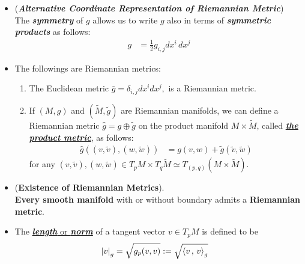 \documentclass[11pt]{article}
\begin{document}
\begin{itemize}
\item \begin{remark} (\emph{\textbf{Alternative Coordinate Representation of Riemannian Metric}})\\
The \emph{\textbf{symmetry}} of $g$ allows us to write $g$ also in terms of \emph{\textbf{symmetric products}} as follows:
\begin{align}
g &=\frac{1}{2}g_{i,j} dx^i\,dx^{j} \label{eqn: riemannian_metric_symmetric_product}
\end{align}
\end{remark}

\item \begin{remark}
The followings are Riemannian metrics:
\begin{enumerate}
\item The Euclidean metric $\bar{g} = \delta_{i,j} dx^i dx^j,$ is a Riemannian metric. 
\item If $(M,g)$ and $(\widetilde{M},\widetilde{g})$ are Riemannian manifolds, we can define a Riemannian metric $\hat{g} = g \oplus \tilde{g}$ on the product manifold
$M \times \widetilde{M}$, called \underline{\emph{\textbf{the product metric}}}, as follows:
\begin{align}
\hat{g}((v,\widetilde{v}), (w, \widetilde{w})) &= g(v,w) + \widetilde{g}(\widetilde{v},\widetilde{w}) \label{eqn: riemannian_product_metric}
\end{align} for any $(v,\widetilde{v}), (w, \widetilde{w}) \in T_{p}M \times T_{q}\widetilde{M} \simeq T_{(p,q)}(M\times \widetilde{M})$. 
\end{enumerate}
\end{remark}


\item \begin{proposition} (\textbf{Existence of Riemannian Metrics}). \citep{lee2003introduction, lee2018introduction}\ \\
\textbf{Every smooth manifold} with or without boundary admits a \textbf{Riemannian metric}.
\end{proposition}

\item \begin{definition}
The \underline{\emph{\textbf{length}} or \emph{\textbf{norm}}} of a tangent vector $v \in T_{p}M$ is defined to be
\begin{align*}
\left\lvert v \right\rvert_{g} &= \sqrt{g_{p}(v, v)} := \sqrt{\left\langle v\,,\, v \right\rangle_g}
\end{align*}
\end{definition}


\end{itemize}
\end{document}
